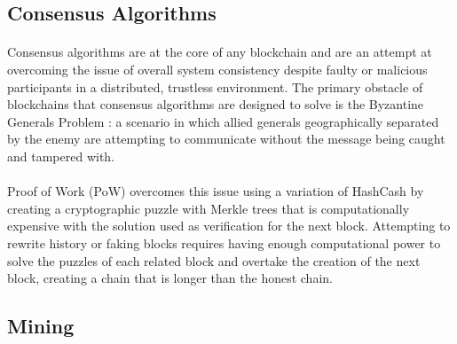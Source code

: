 \subsection{Consensus Algorithms}


\paragraph{} Consensus algorithms are at the core of any blockchain and are an attempt at overcoming the issue of overall system consistency despite faulty or malicious participants in a distributed, trustless environment. The primary obstacle of blockchains that consensus algorithms are designed to solve is the Byzantine Generals Problem \cite{lamportshostakpease1982}: a scenario in which allied generals geographically separated by the enemy are attempting to communicate without the message being caught and tampered with.

\paragraph{} Proof of Work (PoW) overcomes this issue using a variation of HashCash \cite{back2002} by creating a cryptographic puzzle with Merkle trees that is computationally expensive with the solution used as verification for the next block. Attempting to rewrite history or faking blocks requires having enough computational power to solve the puzzles of each related block and overtake the creation of the next block, creating a chain that is longer than the honest chain.


\subsection{Mining} \label{section:mining}

